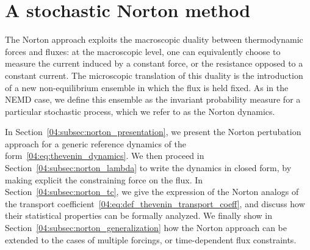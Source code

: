 \section{A stochastic Norton method}\label{04:sec:norton}
The Norton approach exploits the macroscopic duality between thermodynamic forces and fluxes: 
at the macroscopic level, one can equivalently choose to measure the current induced by a constant force, or the resistance opposed to a constant current.
The microscopic translation of this duality is the introduction of a new non-equilibrium ensemble in which the flux is held fixed. As in the NEMD case, we define this ensemble as the invariant probability measure for a particular stochastic process, which we refer to as the Norton dynamics.

In Section~\ref{04:subsec:norton_presentation}, we present the Norton pertubation approach for a generic reference dynamics of the form~\eqref{04:eq:thevenin_dynamics}. We then proceed in Section~\ref{04:subsec:norton_lambda} to write the dynamics in closed form, by making explicit the constraining force on the flux. In Section~\ref{04:subsec:norton_tc}, we give the expression of the Norton analogs of the transport coefficient~\eqref{04:eq:def_thevenin_transport_coeff}, and discuss how their statistical properties can be formally analyzed. We finally show in Section~\ref{04:subsec:norton_generalization} how the Norton approach can be extended to the cases of multiple forcings, or time-dependent flux constraints.

